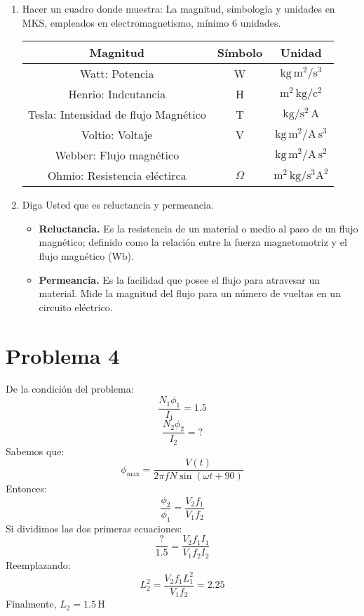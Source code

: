 \documentclass[a4paper,12pt]{article}
\newcommand{\mrm}{\mathrm}
\begin{document}
\begin{enumerate}
\begin{itemize}
    \end{itemize}
    \item Hacer un cuadro donde muestra: La magnitud, simbología y unidades en MKS, empleados en electromagnetismo, mínimo 6 unidades.\\
    \begin{table}[H]
        \centering
        \begin{tabular}{|c|c|c|}
            \hline
             \textbf{Magnitud} & \textbf{Símbolo} & \textbf{Unidad} \\
             \hline
             Watt: Potencia & W & $\mrm{kg\,m^{2}/s^{3}}$ \\
             Henrio: Indcutancia & H & $\mrm{m^{2}\,kg/c^{2}}$\\
             Tesla:  Intensidad de flujo Magnético & T & $\mrm{kg/s^{2}\,A}$\\
             Voltio: Voltaje & V & $\mrm{kg\,m^{2}/A\,s^{3}}$\\
             Webber: Flujo magnético & \mrm{Wb} & $\mrm{kg\,m^{2}/A\,s^{2}}$\\
             Ohmio:  Resistencia eléctirca & $\Omega$ & $\mrm{m^{2}\,kg/s^{3}A^{2}}$\\
             \hline
        \end{tabular}
    \end{table}
    \item Diga Usted que es reluctancia y permeancia.\\
    \begin{itemize}
        \item \textbf{Reluctancia.} Es la resistencia de un material o medio al paso de un flujo magnético; definido como la relación entre la fuerza magnetomotriz y el flujo magnético (Wb).
        \item \textbf{Permeancia.} Es la facilidad que posee el flujo para atravesar un material. Mide la magnitud del flujo para un número de vueltas en un circuito eléctrico.
    \end{itemize}
\end{enumerate}
\section*{Problema 4}
De la condición del problema:
$$
\frac{N_{1}\phi_{1}}{I_{1}} = 1.5
$$
$$
\frac{N_{2}\phi_{2}}{I_{2}} = ?
$$
Sabemos que:
$$
\phi_{\max} = \frac{V(t)}{2\pi f N \sin(\omega t + 90)}
$$
Entonces:
$$
\frac{\phi_{2}}{\phi_{1}} = \frac{V_{2}f_{1}}{V_{1}f_{2}} 
$$
Si dividimos las dos primeras ecuaciones:
$$
\frac{?}{1.5} = \frac{V_{2}f_{1}I_{1}}{V_{1}f_{2}I_{2}}
$$
Reemplazando:
$$
L_{2}^{2} = \frac{V_{2}f_{1}L^{2}_{1}}{V_{1}f_{2}} = 2.25
$$
Finalmente, $L_{2} = 1.5\,\mrm{H}$
\end{document}
